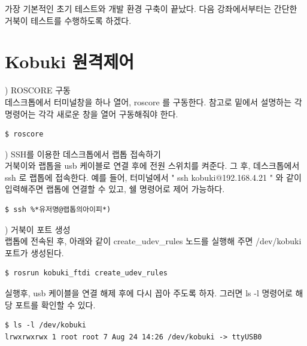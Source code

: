 가장 기본적인 초기 테스트와 개발 환경 구축이 끝났다. 다음 강좌에서부터는 간단한 거북이 테스트를 수행하도록 하겠다.

\section{Kobuki 원격제어}

\setcounter{num}{0}

\vspace{\baselineskip}
\noindent{}
\thenum) ROSCORE 구동\\
데스크톱에서 터미널창을 하나 열어, roscore 를 구동한다. 참고로 밑에서 설명하는 각 명령어는 각각 새로운 창을 열어 구동해줘야 한다.

\begin{lstlisting}[language=ROS]
$ roscore
\end{lstlisting}

\vspace{\baselineskip}
\noindent{}
\thenum) SSH를 이용한 데스크톱에서 랩톱 접속하기\\
거북이와 랩톱을 usb 케이블로 연결 후에 전원 스위치를 켜준다. 그 후, 데스크톱에서 ssh 로 랩톱에 접속한다. 예를 들어, 터미널에서 " ssh kobuki@192.168.4.21 " 와 같이 입력해주면 랩톱에 연결할 수 있고, 쉘 명령어로 제어 가능하다.

\begin{lstlisting}[language=ROS]
$ ssh %*유저명@랩톱의아이피*)
\end{lstlisting}

\vspace{\baselineskip}
\noindent{}
\thenum) 거북이 포트 생성\\
랩톱에 전속된 후, 아래와 같이 create\_udev\_rules 노드를 실행해 주면 /dev/kobuki 포트가 생성된다. 

\begin{lstlisting}[language=ROS]
$ rosrun kobuki_ftdi create_udev_rules
\end{lstlisting}

실행후, usb 케이블을 연결 해제 후에 다시 꼽아 주도록 하자. 그러면 ls -l 명령어로 해당 포트를 확인할 수 있다.

\begin{lstlisting}[language=ROS]
$ ls -l /dev/kobuki
lrwxrwxrwx 1 root root 7 Aug 24 14:26 /dev/kobuki -> ttyUSB0
\end{lstlisting}

